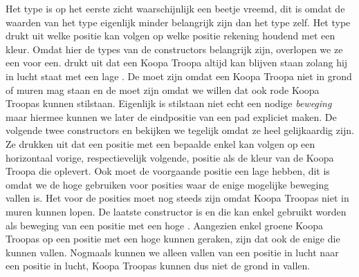 
Het  type is op het eerste zicht waarschijnlijk een beetje
vreemd, dit is omdat de waarden van het type eigenlijk minder belangrijk zijn
dan het type zelf. Het type drukt uit welke positie kan volgen op welke positie
rekening houdend met een kleur. Omdat hier de types van de constructors
belangrijk zijn, overlopen we ze een voor een.  drukt uit dat een
Koopa Troopa altijd kan blijven staan zolang hij in lucht staat met een lage
. De  moet  zijn omdat een Koopa
Troopa niet in grond of muren mag staan en de  moet
 zijn omdat we willen dat ook rode Koopa Troopas kunnen stilstaan.
Eigenlijk is stilstaan niet echt een nodige \emph{beweging} maar hiermee kunnen
we later de eindpositie van een pad expliciet maken. De volgende twee
constructors  en  bekijken we tegelijk omdat ze heel
gelijkaardig zijn. Ze drukken uit dat een positie met een bepaalde
 enkel kan volgen op een horizontaal vorige, respectievelijk
volgende, positie als de kleur van de Koopa Troopa die 
oplevert. Ook moet de voorgaande positie een lage  hebben, dit
is omdat we de hoge  gebruiken voor posities waar de enige
mogelijke beweging vallen is. Het  voor de posities moet nog
steeds  zijn omdat Koopa Troopas niet in muren kunnen lopen.  De
laatste constructor is  en die kan enkel gebruikt worden als
beweging van een positie met een hoge . Aangezien enkel groene
Koopa Troopas op een positie met een hoge  kunnen geraken,
zijn dat ook de enige die kunnen vallen. Nogmaals kunnen we alleen vallen van
een positie in lucht naar een positie in lucht, Koopa Troopas kunnen dus niet
de grond in vallen.

